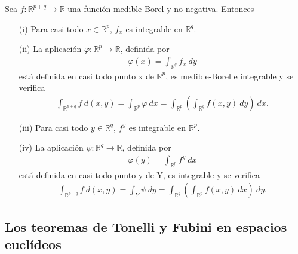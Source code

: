 \begin{cor}
    Sea $f: \mathbb{R}^{p+q} \longrightarrow \mathbb{R}$ una función medible-Borel y no negativa. Entonces
    \begin{enumerate}
        \item[(i)] Para casi todo $x \in \mathbb{R}^p$, $f_x$ es integrable en $\mathbb{R}^q$.
        \item[(ii)] La aplicación $\varphi: \mathbb{R}^p \longrightarrow \mathbb{R}$, definida por
              \begin{align*}
                  \varphi(x) = \int_{\mathbb{R}^q}{f_x \ dy}
              \end{align*}
              está definida en casi todo punto x de $\mathbb{R}^p$, es medible-Borel e integrable y se verifica
              \begin{align*}
                  \int_{\mathbb{R}^{p+q}}{f \ d(x,y)} = \int_{\mathbb{R}^p}{\varphi \ dx} = \int_{\mathbb{R}^p}\left( \int_{\mathbb{R}^q}{f(x,y) \ dy}\right) \ dx.
              \end{align*}
        \item[(iii)] Para casi todo $y \in \mathbb{R}^q$, $f^y$ es integrable en $\mathbb{R}^p$.
        \item[(iv)] La aplicación $\psi: \mathbb{R}^q \longrightarrow \mathbb{R}$, definida por
              \begin{align*}
                  \varphi(y) = \int_{\mathbb{R}^p}{f^y \ dx}
              \end{align*}
              está definida en casi todo punto y de Y, es integrable  y se verifica
              \begin{align*}
                  \int_{\mathbb{R}^{p+q}}{f \ d(x,y)} = \int_{Y}{\psi \ dy} = \int_{\mathbb{R}^q}\left( \int_{\mathbb{R}^p}{f(x,y) \ dx}\right) \ dy.
              \end{align*}
    \end{enumerate}
\end{cor}

\subsection{Los teoremas de Tonelli y Fubini en espacios euclídeos}

